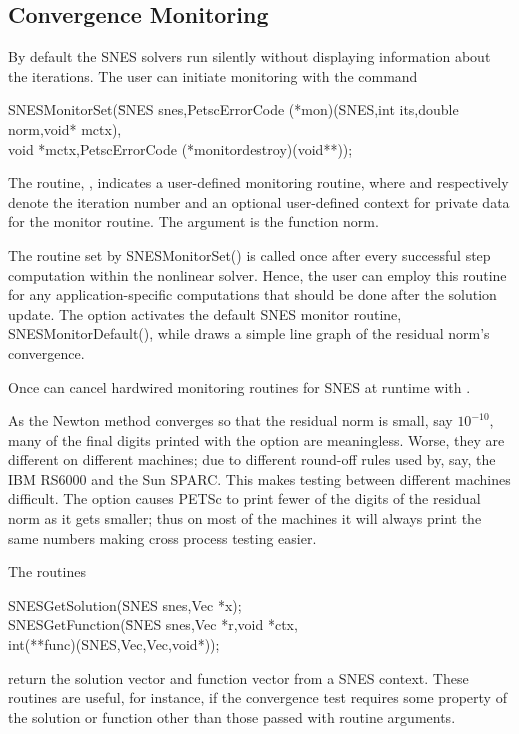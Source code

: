 \subsection{Convergence Monitoring}
\label{sec_snesmonitor}

By default the SNES solvers run silently without displaying information
about the iterations. The user can initiate monitoring with the
command
\begin{tabbing}
  SNESMonitorSet(\=SNES snes,PetscErrorCode (*mon)(SNES,int its,double norm,void* mctx),\\
                 \>        void *mctx,PetscErrorCode (*monitordestroy)(void**));
\end{tabbing}
The routine, , indicates a user-defined monitoring routine,
where  and  respectively denote the iteration
number and an optional user-defined context for private data for the
monitor routine.  The argument  is the function norm.

The routine set by SNESMonitorSet() is called once after every
successful step computation within the nonlinear solver.  Hence, the
user can employ this routine for any application-specific computations
that should be done after the solution update. The option
  activates the default
SNES monitor routine, SNESMonitorDefault(),
while   draws
a simple line graph of the residual norm's convergence.

Once can cancel hardwired monitoring routines for SNES at runtime with
. 

As the Newton method converges so that the residual norm is small,
say $ 10^{-10} $, many of the final digits printed with the 
option are meaningless. Worse, they are different on different
machines; due to different round-off rules used by, say, the IBM RS6000
and the Sun SPARC. This makes testing between different machines
difficult. The option  
causes PETSc to print fewer of the digits of the residual norm
as it gets smaller; thus on most of the machines it will always
print the same numbers making cross process testing easier.

The routines
\begin{tabbing}
  SNESGetSolution(SNES snes,Vec *x);\\
  SNESGetFunction(\=SNES snes,Vec *r,void *ctx,\\
                  \>        int(**func)(SNES,Vec,Vec,void*));
\end{tabbing}
return the solution vector and function vector from a SNES context.
These routines are useful, for instance, if the convergence test requires
some property of the solution or function other than those passed with
routine arguments.

